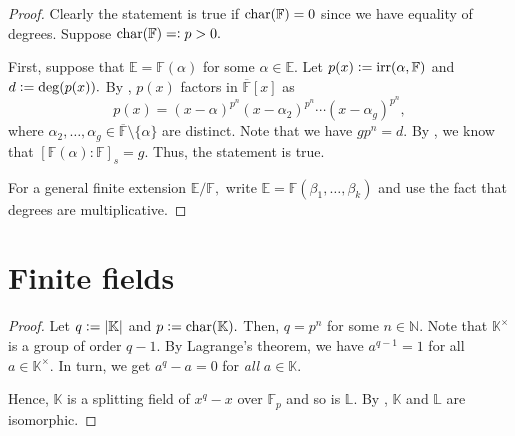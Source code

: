 \sepdegdividesdeg*\label{prop:sepdegdividesdeg2}
\begin{flushright}\hyperref[prop:sepdegdividesdeg]{\upsym}\end{flushright}
\begin{proof}
    Clearly the statement is true if $\operatorname{char}(\mathbb{F}) = 0$ since we have equality of degrees. Suppose $\operatorname{char}(\mathbb{F}) =\vcentcolon p > 0.$

    First, suppose that $\mathbb{E} = \mathbb{F}(\alpha)$ for some $\alpha \in \mathbb{E}.$ Let $p(x) \vcentcolon= \operatorname{irr}(\alpha, \mathbb{F})$ and $d \vcentcolon= \deg(p(x)).$ By , $p(x)$ factors in $\overline{\mathbb{F}}[x]$ as
    \begin{equation*} 
        p(x) = (x - \alpha)^{p^n} (x - \alpha_2)^{p^n} \cdots (x - \alpha_g)^{p^n},
    \end{equation*}
    where $\alpha_2, \ldots, \alpha_g \in \overline{\mathbb{F}}\setminus\{\alpha\}$ are distinct. Note that we have $gp^n = d.$ By , we know that $[\mathbb{F}(\alpha) : \mathbb{F}]_s = g.$ Thus, the statement is true.

    For a general finite extension $\mathbb{E}/\mathbb{F},$ write $\mathbb{E} = \mathbb{F}(\beta_1, \ldots, \beta_k)$ and use the fact that degrees are multiplicative.
\end{proof}

\section{Finite fields}
\uniquefinfields*\label{thm:uniquefinfields2}
\begin{flushright}\hyperref[thm:uniquefinfields]{\upsym}\end{flushright}
\begin{proof}
    Let $q \vcentcolon= {\left\lvert \mathbb{K} \right\lvert}$ and $p \vcentcolon= \operatorname{char}(\mathbb{K}).$ Then, $q = p^n$ for some $n \in \mathbb{N}.$ Note that $\mathbb{K}^\times$ is a group of order $q - 1.$ By Lagrange's theorem, we have $a^{q - 1} = 1$ for all $a \in \mathbb{K}^\times.$ In turn, we get $a^q - a = 0$ for \emph{all} $a \in \mathbb{K}.$

    Hence, $\mathbb{K}$ is a splitting field of $x^q - x$ over $\mathbb{F}_p$ and so is $\mathbb{L}.$ By , $\mathbb{K}$ and $\mathbb{L}$ are isomorphic.
\end{proof}


